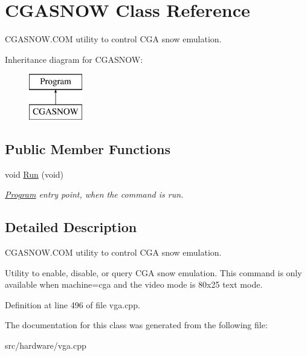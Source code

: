 \hypertarget{classCGASNOW}{\section{C\-G\-A\-S\-N\-O\-W Class Reference}
\label{classCGASNOW}
}


C\-G\-A\-S\-N\-O\-W.\-C\-O\-M utility to control C\-G\-A snow emulation.  


Inheritance diagram for C\-G\-A\-S\-N\-O\-W\-:\begin{figure}[H]
\begin{center}
\leavevmode
\includegraphics[height=2.000000cm]{classCGASNOW}
\end{center}
\end{figure}
\subsection*{Public Member Functions}
\begin{DoxyCompactItemize}
\item 
\hypertarget{classCGASNOW_a756619df2231c00d48df4bfec4a8965b}{void \hyperlink{classCGASNOW_a756619df2231c00d48df4bfec4a8965b}{Run} (void)}\label{classCGASNOW_a756619df2231c00d48df4bfec4a8965b}

\begin{DoxyCompactList}\small\item\em \hyperlink{classProgram}{Program} entry point, when the command is run. \end{DoxyCompactList}\end{DoxyCompactItemize}


\subsection{Detailed Description}
C\-G\-A\-S\-N\-O\-W.\-C\-O\-M utility to control C\-G\-A snow emulation. 

Utility to enable, disable, or query C\-G\-A snow emulation. This command is only available when machine=cga and the video mode is 80x25 text mode. 

Definition at line 496 of file vga.\-cpp.



The documentation for this class was generated from the following file\-:\begin{DoxyCompactItemize}
\item 
src/hardware/vga.\-cpp\end{DoxyCompactItemize}
